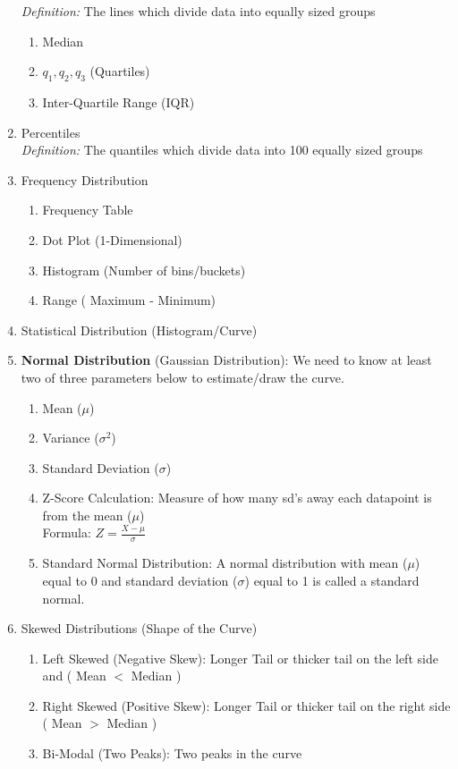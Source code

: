 \documentclass[11pt]{article}
\begin{document}
\begin{enumerate}
		\textit{Definition:} The lines which divide data into equally sized groups
		\begin{enumerate}
			\item Median
			\item $q_1 , q_2, q_3$ (Quartiles)
			\item Inter-Quartile Range (IQR)
		\end{enumerate}
		\newpage
		\item Percentiles\\
		\textit{Definition:} The quantiles which divide data into 100 equally sized groups
		\item Frequency Distribution
		\begin{enumerate}
			\item Frequency Table
			\item Dot Plot (1-Dimensional)
			\item Histogram (Number of bins/buckets)
			\item Range ( Maximum - Minimum)
		\end{enumerate}
		\item Statistical Distribution (Histogram/Curve)
		\item \textbf{Normal Distribution} (Gaussian Distribution): We need to know at least two of three parameters below to estimate/draw the curve.
		\begin{enumerate}
			\item Mean ($\mu$)
			\item Variance ($\sigma^2$)
			\item Standard Deviation ($\sigma$)
			\item Z-Score Calculation: Measure of how many sd's away each datapoint is from the mean ($ \mu $) \\
			Formula:
			$Z = \frac{X - \mu}{\sigma}$
			\item Standard Normal Distribution: A normal distribution with mean ($\mu$) equal to 0 and standard deviation ($\sigma$) equal to 1 is called a standard normal.
		\end{enumerate}
		\item Skewed Distributions (Shape of the Curve)
		\begin{enumerate}
			\item Left Skewed (Negative Skew): Longer Tail or thicker tail on the left side and ( Mean $<$ Median )
			\item Right Skewed (Positive Skew): Longer Tail or thicker tail on the right side ( Mean $>$ Median )
			\item Bi-Modal (Two Peaks): Two peaks in the curve

\end{enumerate}
\end{enumerate}
\end{document}
